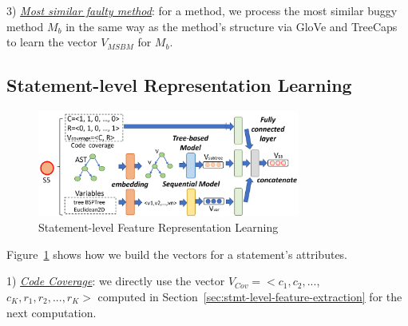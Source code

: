
3) {\em \underline{Most similar faulty method}}: for a method, we
process the most similar buggy method $M_b$ 
in the same way as the method's structure via GloVe and TreeCaps to
learn the vector $V_{MSBM}$ for $M_b$.


\subsection{Statement-level Representation Learning}

\begin{figure}[t]
	\centering
	\includegraphics[width=3.4in]{graphs/step-2-statement-new.png}
        \vspace{-16pt}
	\caption{Statement-level Feature Representation Learning}
	\label{statement-level-feature-learning}
\end{figure}

Figure~\ref{statement-level-feature-learning} shows how we build the
vectors for a statement's attributes.

1) {\em \underline{Code Coverage}}: we directly use the vector
$V_{Cov} = <c_1, c_2, ...$, $c_K, r_1, r_2, ..., r_K>$ computed in
Section~\ref{sec:stmt-level-feature-extraction} for the next
computation.

